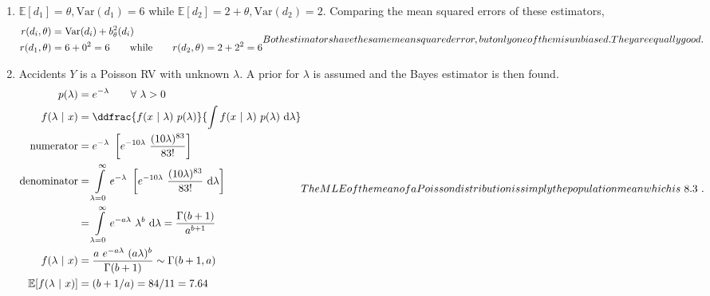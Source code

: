 \begin{enumerate}
	\item  $ \mathbb{E}[d_1] = \theta, \mathrm{Var}(d_1) = 6 $ while $ \mathbb{E}[d_2] = 2 + \theta, \mathrm{Var}(d_2) = 2 $. Comparing the mean squared errors of these estimators,\\
	\begin{subequations}
		\begin{align}
			r(d_i, \theta) &= \mathrm{Var}(d_i) + b_\theta^2 (d_i) \nonumber \\
			r(d_1, \theta) &= 6 + 0^2 = 6 \qquad \text{while} \qquad r(d_2, \theta) = 2 + 2^2 = 6
		\end{align}\\
		Both estimators have the same mean squared error, but only one of them is unbiased. They are equally good. \\
	\end{subequations}
	
	\item Accidents $ Y $ is a Poisson RV with unknown $ \lambda $. A prior for $ \lambda $ is assumed and the Bayes estimator is then found. \\
	\begin{subequations}
		\begin{align}
			p(\lambda) &= e^{-\lambda} \qquad \forall\ \lambda > 0 \nonumber \\
			f(\lambda\ |\ x) &= \ddfrac{f(x\ |\ \lambda)\ p(\lambda)}{\int f(x\ |\ \lambda)\ p(\lambda)\ \mathrm{d}\lambda} \\
			\text{numerator}&= e^{-\lambda}\ \left[e^{-10\lambda}\ \dfrac{(10\lambda)^{83}}{83!}\right] \nonumber \\
			\text{denominator}&= \int\limits_{\lambda=0}^{\infty} e^{-\lambda}\ \left[e^{-10\lambda}\ \dfrac{(10\lambda)^{83}}{83!}\ \mathrm{d}\lambda\right] \nonumber \\
			&= \int\limits_{\lambda=0}^{\infty} e^{-a\lambda}\ \lambda^{b}\ \mathrm{d}\lambda = \frac{\Gamma(b+1)}{a^{b+1}}\nonumber \\
			f(\lambda\ |\ x) &= \frac{a\ e^{-a\lambda}\ (a\lambda)^{b}}{\Gamma(b+1)} \sim \Gamma(b+1, a) \\
			\mathbb{E}[f(\lambda\ |\ x)] &= (b+1/a) = 84/11 = 7.64
		\end{align}\\
	
	The MLE of the mean of a Poisson distribution is simply the population mean which is $ 8.3 $.
	\end{subequations}


\end{enumerate}
